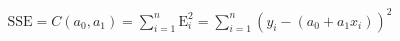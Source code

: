 \documentclass[preview]{standalone}
\begin{document}
\begin{align*}
\text{SSE} = C(a_0, a_1) =  \sum_{i=1}^{n} \text{E}_i^2 = \sum_{i=1}^{n} (y_i - (a_0 + a_1x_i))^2
\end{align*}
\end{document}
